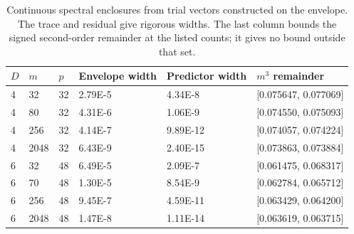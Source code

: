 \begin{table}[htbp]
\centering
\caption{Continuous spectral enclosures from trial vectors constructed on the envelope. The trace and residual give rigorous widths. The last column bounds the signed second-order remainder at the listed counts; it gives no bound outside that set.}
\label{tab:predictor_residual}
\begin{tabular}{llllll}
\toprule
$D$ & $m$ & $p$ & Envelope width & Predictor width & $m^3$ remainder \\
\midrule
4 & 32 & 32 & 2.79E-5 & 4.34E-8 & [0.075647, 0.077069] \\
4 & 80 & 32 & 4.31E-6 & 1.06E-9 & [0.074550, 0.075093] \\
4 & 256 & 32 & 4.14E-7 & 9.89E-12 & [0.074057, 0.074224] \\
4 & 2048 & 32 & 6.43E-9 & 2.40E-15 & [0.073863, 0.073884] \\
6 & 32 & 48 & 6.49E-5 & 2.09E-7 & [0.061475, 0.068317] \\
6 & 70 & 48 & 1.30E-5 & 8.54E-9 & [0.062784, 0.065712] \\
6 & 256 & 48 & 9.45E-7 & 4.59E-11 & [0.063429, 0.064200] \\
6 & 2048 & 48 & 1.47E-8 & 1.11E-14 & [0.063619, 0.063715] \\
\bottomrule
\end{tabular}
\end{table}
